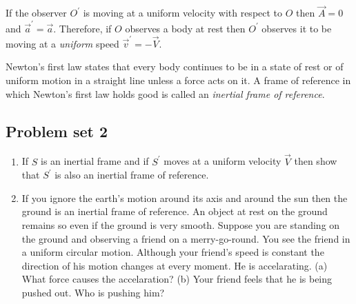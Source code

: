 If the observer $O^\prime$ is moving at a uniform velocity with respect to $O$
then $\vec{A} = 0$ and $\vec{a}^\prime = \vec{a}$. Therefore, if $O$ observes
a body at rest then $O^\prime$ observes it to be moving at a \emph{uniform}
speed $\vec{v}^\prime = -\vec{V}$.

Newton's first law states that every body continues to be in a state of rest
or of uniform motion in a straight line unless a force acts on it. A frame of
reference in which Newton's first law holds good is called an \emph{inertial
frame of reference}. 

\subsection{Problem set 2}\label{c1s1s2}
\begin{enumerate}
\item If $S$ is an inertial frame and if $S^\prime$ moves at a uniform velocity
$\vec{V}$ then show that $S^\prime$ is also an inertial frame of reference.
\item If you ignore the earth's motion around its axis and around the sun then
the ground is an inertial frame of reference. An object at rest on the ground
remains so even if the ground is very smooth. Suppose you are standing on the
ground and observing a friend on a merry-go-round. You see the friend in a 
uniform circular motion. Although your friend's speed is constant the direction
of his motion changes at every moment. He is accelarating. (a) What force 
causes the accelaration? (b) Your friend feels that he is being pushed out.
Who is pushing him?
\end{enumerate}

